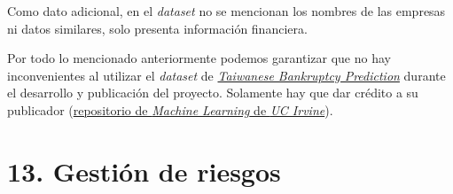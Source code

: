 \documentclass[
11pt, %
]{charter}
\begin{document}
Como dato adicional, en el \textit{dataset} no se mencionan los nombres de las empresas ni datos similares, solo presenta información financiera.

Por todo lo mencionado anteriormente podemos garantizar que no hay inconvenientes al utilizar el \textit{dataset} de \href{https://archive.ics.uci.edu/dataset/572/taiwanese+bankruptcy+prediction}{\textit{Taiwanese Bankruptcy Prediction}} durante el desarrollo y publicación del proyecto. Solamente hay que dar crédito a su publicador (\href{https://archive.ics.uci.edu/}{repositorio de \textit{Machine Learning} de \textit{UC Irvine}}).

\section{13. Gestión de riesgos}
\label{sec:riesgos}
\end{document}
